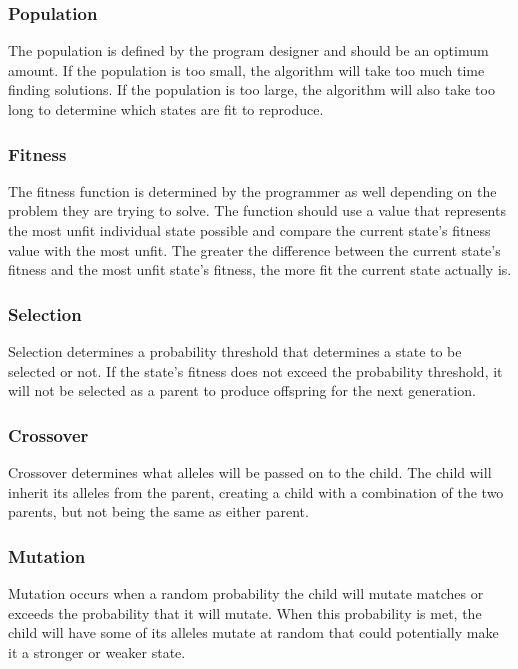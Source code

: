 \documentclass{vgtc}                          %
\begin{document}
\subsubsection{Population} 
The population is defined by the program designer and should be an optimum amount. If the population is too small, the algorithm will take too much time finding solutions. If the population is too large, the algorithm will also take too long to determine which states are fit to reproduce.\\ 

\subsubsection{Fitness}
The fitness function is determined by the programmer as well depending on the problem they are trying to solve. The function should use a value that represents the most unfit individual state possible and compare the current state's fitness value with the most unfit. The greater the difference between the current state's fitness and the most unfit state's fitness, the more fit the current state actually is.\\ 

\subsubsection{Selection}
Selection determines a probability threshold that determines a state to be selected or not. If the state's fitness does not exceed the probability threshold, it will not be selected as a parent to produce offspring for the next generation.\\ 

\subsubsection{Crossover}
Crossover determines what alleles will be passed on to the child. The child will inherit its alleles from the parent, creating a child with a combination of the two parents, but not being the same as either parent.\\ 

\subsubsection{Mutation} 
Mutation occurs when a random probability the child will mutate matches or exceeds the probability that it will mutate. When this probability is met, the child will have some of its alleles mutate at random that could potentially make it a stronger or weaker state. 
\end{document}
